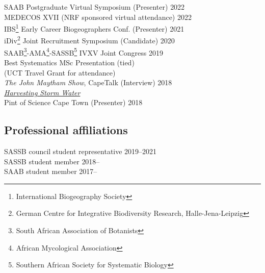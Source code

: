 \documentclass[10pt]{article}
\begin{document}
\begin{multicols}{2}
SAAB Postgraduate Virtual Symposium {\small (Presenter)}  \hfill {\small 2022} \\
MEDECOS XVII                        {\small (NRF sponsored virtual attendance)}
                                                          \hfill {\small 2022} \\
IBS\footnote{
    International Biogeography Society}
  Early Career Biogeographers Conf. {\small (Presenter)}  \hfill {\small 2021} \\
iDiv\footnote{
    German Centre for Integrative Biodiversity Research, Halle-Jena-Leipzig}
  Joint Recruitment Symposium       {\small (Candidate)}  \hfill {\small 2020} \\
SAAB\footnote{
    South African Association of Botanists}-AMA\footnote{
      African Mycological Association}-SASSB\footnote{
        Southern African Society for Systematic Biology}
  IVXV Joint Congress                                     \hfill {\small 2019} \\
  \hspace{2em} {\small Best Systematics MSc Presentation (tied)}               \\
  \hspace{2em} {\small (UCT Travel Grant for attendance)}                      \\
\textit{The John Maytham Show}, CapeTalk {\small (Interview)} \hfill {\small 2018} \\
  \hspace{2em} {\small \href{https://www.capetalk.co.za/articles/328900/harvesting-stormwater-from-liesbeek-river-may-aid-ct-water-supply-students-find}{\textit{Harvesting Storm Water}}} \\
Pint of Science Cape Town           {\small (Presenter)}  \hfill {\small 2018}

\subsection*{Professional affiliations} %

SASSB council student representative   \hfill {\small 2019--2021            } \\
SASSB student member                   \hfill {\small 2018--\hspace*{2.25em}} \\
SAAB student member                    \hfill {\small 2017--\hspace*{2.25em}}

\end{multicols} %
\end{document}
